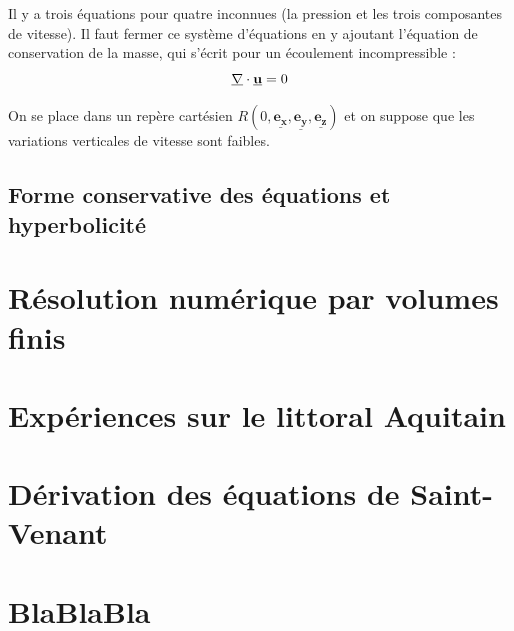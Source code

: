 \documentclass[
a4paper,
11pt,
titlepage,
]{article}
\renewcommand{\vec}[1]{\mathbf{\underline{#1}}}
\begin{document}
Il y a trois équations pour quatre inconnues (la pression et les trois composantes de vitesse). Il faut fermer ce système d'équations en y ajoutant l'équation de conservation de la masse, qui s'écrit pour un écoulement incompressible :
\begin{equation}
  \label{eq:masscons}
  \vec{\nabla}\cdot\vec{u} = 0\\	
\end{equation}

On se place dans un repère cartésien $R(0,\vec{e_x},\vec{e_y},\vec{e_z})$ et on suppose que les variations verticales de vitesse sont faibles.
\subsection{Forme conservative des équations et hyperbolicité}

\section{Résolution numérique par volumes finis}

\section{Expériences sur le littoral Aquitain}

\newpage
\label{myLastPage}

\newpage

\printbibliography
{}

\begin{appendices}

  \section{Dérivation des équations de Saint-Venant}
  \label{sec:deriv-des-equat}

  \section{BlaBlaBla}
  \label{sec:blablabla}


\end{appendices}
\end{document}

